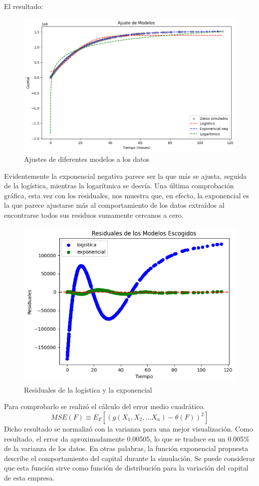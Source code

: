 \documentclass[spanish]{article}
\begin{document}
El resultado:
\begin{figure}[H]
    \centering
    \includegraphics[scale=0.5]{ajustes_de_modelos.png}
    \caption{Ajustes de diferentes modelos a los datos}
    \label{fig:Ajustes de los modelos a los datos}
\end{figure}
Evidentemente la exponencial negativa parece ser la que m\'as se ajusta, seguida de la log\'istica, mientras la logar\'itmica se desv\'ia.
Una \'ultima comprobaci\'on gr\'afica, esta vez con los residuales, nos muestra que, en efecto, la exponencial es la que parece ajustarse m\'as al comportamiento de los datos extra\'idos al encontrarse todos sus residuos sumamente cercanos a cero.
\begin{figure}[H]
    \centering
    \includegraphics[scale=0.5]{residuales.png}
    \caption{Residuales de la log\'istica y la exponencial}
    \label{fig:Residuales de la log\'istica y la exponencial}
\end{figure}
Para comprobarlo se realiz\'o el c\'alculo del error medio cuadr\'atico.
\begin{equation}
    MSE(F) \equiv E_F[(g(X_1,X_2,\dots X_n) - \theta(F))^2]
\end{equation}
Dicho resultado se normaliz\'o con la varianza para una mejor visualizaci\'on. 
Como resultado, el error da aproximadamente 0.00505, lo que se traduce en un 0.005\% de la varianza de los datos. En otras palabras, la funci\'on exponencial propuesta describe el comportamiento del capital durante la simulaci\'on. Se puede considerar que esta funci\'on sirve como funci\'on de distribuci\'on para la variaci\'on del capital de esta empresa.
\end{document}
